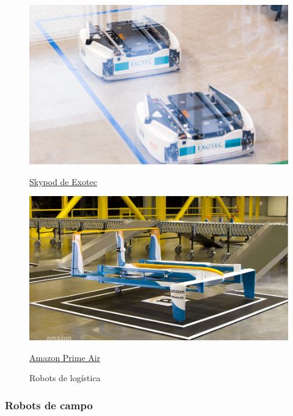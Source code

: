 \begin{figure}[ht!]
	\centering
	\begin{minipage}{0.3\linewidth}
		\centering
		\includegraphics[width=\linewidth]{figs/skypod.png}
		\caption*{\centering\href{https://exotecbydexter.com/skypod/}{Skypod de Exotec} }
	\end{minipage}
	\hspace{3cm}
	\begin{minipage}{0.3\linewidth}
		\centering
		\includegraphics[width=\linewidth]{figs/amazon.png}
		\caption*{\centering\href{https://www.aboutamazon.es/noticias/innovacion/prime-air}{Amazon Prime Air}}
	\end{minipage}
	\caption{Robots de logística}
	\label{fig:robreparto}
\end{figure}

\subsubsection{Robots de campo}


